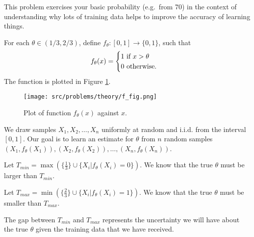 \documentclass[preview]{standalone}
\begin{document}


This problem exercises your basic probability (e.g.~from 70) in the
context of understanding why lots of training data helps to improve the
accuracy of learning things.

For each $\theta \in (1/3,2/3)$, define $f_{\theta}: [0,1] \to \{0, 1\}$, such that
\begin{align}
f_\theta(x) =
\begin{cases}
1 \text{ if } x > \theta \notag\\
0 \text{ otherwise.} \label{eq:func}
\end{cases}
\end{align}
The function is plotted in Figure \ref{fig:func}.
\begin{figure}[h!]
    \begin{center}
    \texttt{[image: src/problems/theory/f\_fig.png]}
    \caption{Plot of function $f_\theta(x)$ against $x$.} \label{fig:func}
    \end{center}
\end{figure}

We draw samples $X_1, X_2, \ldots, X_n$ uniformly at random and i.i.d. from the interval $[0,1]$.
Our goal is to learn an estimate for $\theta$ from $n$ random samples $(X_1, f_{\theta}(X_1)), (X_2, f_{\theta}(X_2)), \ldots, (X_n, f_{\theta}(X_n))$.


Let $T_{min} = \max(\{\frac{1}{3}\} \cup \{ X_i | f_\theta(X_i) = 0\})$. We know that the
true $\theta$ must be larger than $T_{min}$. 

Let $T_{max} = \min(\{\frac{2}{3}\} \cup \{ X_i | f_\theta(X_i) = 1\})$. We know that the
true $\theta$ must be smaller than $T_{max}$. 

The gap between $T_{min}$ and $T_{max}$ represents the uncertainty we
will have about the true $\theta$ given the training data that we have
received. 
\end{document}
